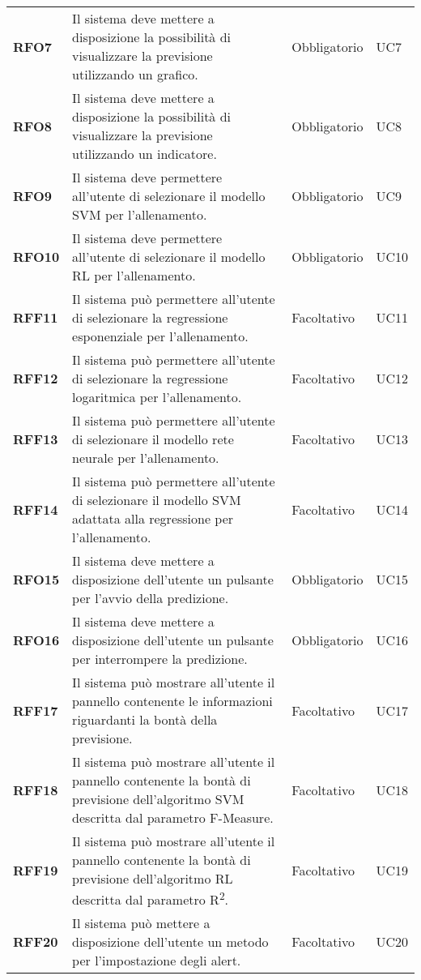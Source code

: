 \begin{longtable}[H]{>{\centering\bfseries}m{2cm} >{\centering}m{9cm} >{\centering}m{2.5cm} >{\centering\arraybackslash}m{2.5cm}}
  \textbf{RFO7} & Il sistema deve mettere a disposizione la possibilità di visualizzare la previsione utilizzando un grafico. & Obbligatorio & UC7 \\
  \textbf{RFO8} & Il sistema deve mettere a disposizione la possibilità di visualizzare la previsione utilizzando un indicatore. & Obbligatorio & UC8 \\
  \textbf{RFO9} & Il sistema deve permettere all'utente di selezionare il modello SVM per l'allenamento. & Obbligatorio & UC9 \\
  \textbf{RFO10} & Il sistema deve permettere all'utente di selezionare il modello RL per l'allenamento. & Obbligatorio & UC10 \\
  \textbf{RFF11} & Il sistema può permettere all'utente di selezionare la regressione esponenziale per l'allenamento. & Facoltativo & UC11 \\
  \textbf{RFF12} & Il sistema può permettere all'utente di selezionare la regressione logaritmica per l'allenamento. & Facoltativo & UC12 \\
  \textbf{RFF13} & Il sistema può permettere all'utente di selezionare il modello rete neurale per l'allenamento. & Facoltativo & UC13 \\
  \textbf{RFF14} & Il sistema può permettere all'utente di selezionare il modello SVM adattata alla regressione per l'allenamento. & Facoltativo & UC14 \\
  \textbf{RFO15} & Il sistema deve mettere a disposizione dell’utente un pulsante per l’avvio della predizione. & Obbligatorio & UC15 \\
  \textbf{RFO16} & Il sistema deve mettere a disposizione dell’utente un pulsante per interrompere la predizione. & Obbligatorio & UC16 \\
  \textbf{RFF17} & Il sistema può mostrare all'utente il pannello contenente le informazioni riguardanti la bontà della previsione. & Facoltativo & UC17 \\
  \textbf{RFF18} & Il sistema può mostrare all'utente il pannello contenente la bontà di previsione dell'algoritmo SVM descritta dal parametro F-Measure. & Facoltativo & UC18 \\
  \textbf{RFF19} & Il sistema può mostrare all'utente il pannello contenente la bontà di previsione dell'algoritmo RL descritta dal parametro R\textsuperscript{2}. & Facoltativo & UC19 \\
  \textbf{RFF20} & Il sistema può mettere a disposizione dell’utente un metodo per l’impostazione degli alert. & Facoltativo & UC20 \\

\end{longtable}
